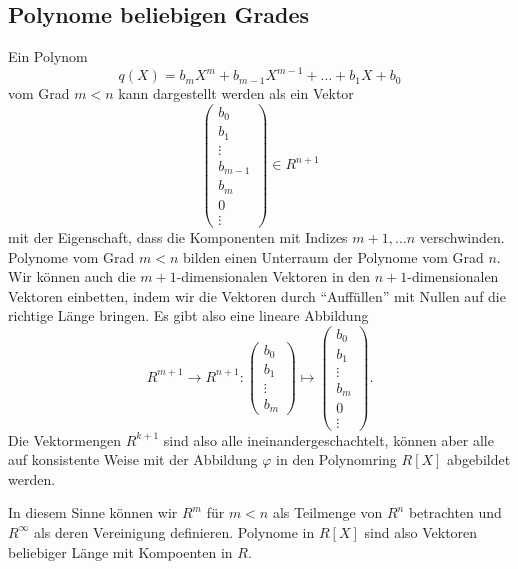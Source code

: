 \subsection{Polynome beliebigen Grades
\label{buch:subsection:polynome:beliebigergrad}}
Ein Polynom
\[
q(X)
=
b_mX^m + b_{m-1}X^{m-1} + \dots + b_1X + b_0
\]
vom Grad $m<n$ kann dargestellt werden als ein Vektor
\[
\begin{pmatrix}
b_0\\
b_1\\
\vdots\\
b_{m-1}\\
b_{m}\\
0\\
\vdots
\end{pmatrix}
\in
R^{n+1}
\]
mit der Eigenschaft, dass die Komponenten mit Indizes
$m+1,\dots n$ verschwinden.
Polynome vom Grad $m<n$ bilden einen Unterraum der Polynome vom Grad $n$.
Wir können auch die $m+1$-dimensionalen Vektoren in den $n+1$-dimensionalen
Vektoren einbetten, indem wir die Vektoren durch ``Auffüllen'' mit Nullen
auf die richtige Länge bringen.
Es gibt also eine lineare Abbildung
\[
R^{m+1} \to R^{n+1}
\colon
\begin{pmatrix}
b_0\\b_1\\\vdots\\b_m
\end{pmatrix}
\mapsto
\begin{pmatrix}
b_0\\b_1\\\vdots\\b_m\\0\\\vdots
\end{pmatrix}
.
\]
Die Vektormengen $R^{k+1}$ sind also alle ineinandergeschachtelt, können aber
alle auf konsistente Weise mit der Abbildung $\varphi$ in den Polynomring
$R[X]$ abgebildet werden.
\begin{center}
\end{center}
In diesem Sinne können wir $R^m$ für $m<n$ als Teilmenge von $R^n$ betrachten
und $R^\infty$ als deren Vereinigung definieren.
Polynome in $R[X]$ sind also Vektoren beliebiger Länge mit Kompoenten
in $R$.

